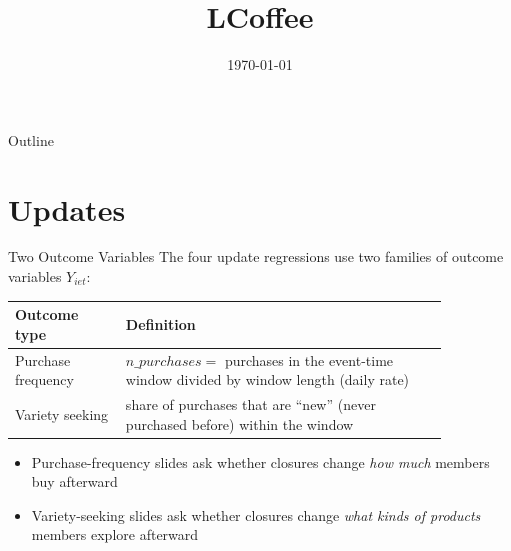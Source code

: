 \documentclass[aspectratio=169]{beamer}  %
\title{LCoffee}
\date{\today}
\begin{document}
\begin{frame}
    \titlepage
\end{frame}

\begin{frame}{Outline}
    \tableofcontents
\end{frame}




\section{Updates}
\begin{frame}{Two Outcome Variables}
\small
The four update regressions use two families of outcome variables $Y_{iet}$:

\begin{table}[h]
\centering
\scriptsize
\begin{tabular}{p{0.22\linewidth} p{0.64\linewidth}}
\toprule
\textbf{Outcome type} & \textbf{Definition} \\
\midrule
Purchase frequency &
$n\_purchases =$ purchases in the event-time window divided by window length (daily rate) \\
Variety seeking &
share of purchases that are ``new'' (never purchased before) within the window \\
\bottomrule
\end{tabular}
\end{table}

\begin{itemize}
    \item Purchase-frequency slides ask whether closures change \emph{how much} members buy afterward
    \item Variety-seeking slides ask whether closures change \emph{what kinds of products} members explore afterward
\end{itemize}
\end{frame}
\end{document}
